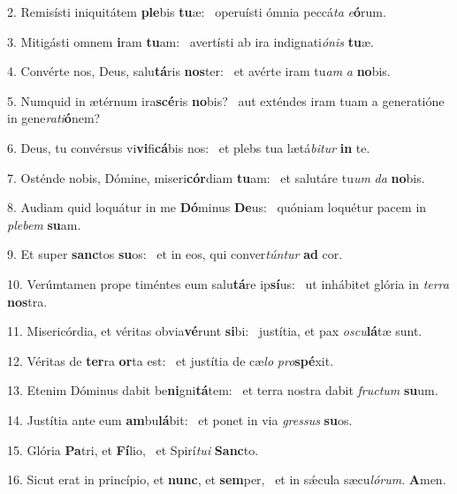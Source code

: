 2. Remisísti iniquitátem \textbf{ple}bis \textbf{tu}æ: \ast\  operuísti ómnia peccá\textit{ta} \textit{e}\textbf{ó}rum.\

3. Mitigásti omnem \textbf{i}ram \textbf{tu}am: \ast\  avertísti ab ira indignati\textit{ó}\textit{nis} \textbf{tu}æ.\

4. Convérte nos, Deus, salu\textbf{tá}ris \textbf{nos}ter: \ast\  et avérte iram tu\textit{am} \textit{a} \textbf{no}bis.\

5. Numquid in ætérnum ira\textbf{scé}ris \textbf{no}bis? \ast\  aut exténdes iram tuam a generatióne in gene\textit{ra}\textit{ti}\textbf{ó}nem?\

6. Deus, tu convérsus vi\textbf{vi}fi\textbf{cá}bis nos: \ast\  et plebs tua lætá\textit{bi}\textit{tur} \textbf{in} te.\

7. Osténde nobis, Dómine, miseri\textbf{cór}diam \textbf{tu}am: \ast\  et salutáre tu\textit{um} \textit{da} \textbf{no}bis.\

8. Audiam quid loquátur in me \textbf{Dó}minus \textbf{De}us: \ast\  quóniam loquétur pacem in \textit{ple}\textit{bem} \textbf{su}am.\

9. Et super \textbf{sanc}tos \textbf{su}os: \ast\  et in eos, qui conver\textit{tún}\textit{tur} \textbf{ad} cor.\

10. Verúmtamen prope timéntes eum salu\textbf{tá}re ip\textbf{sí}us: \ast\  ut inhábitet glória in \textit{ter}\textit{ra} \textbf{nos}tra.\

11. Misericórdia, et véritas obvia\textbf{vé}runt \textbf{si}bi: \ast\  justítia, et pax \textit{os}\textit{cu}\textbf{lá}tæ sunt.\

12. Véritas de \textbf{ter}ra \textbf{or}ta est: \ast\  et justítia de cæ\textit{lo} \textit{pro}\textbf{spé}xit.\

13. Etenim Dóminus dabit be\textbf{ni}gni\textbf{tá}tem: \ast\  et terra nostra dabit \textit{fruc}\textit{tum} \textbf{su}um.\

14. Justítia ante eum \textbf{am}bu\textbf{lá}bit: \ast\  et ponet in via \textit{gres}\textit{sus} \textbf{su}os.\

15. Glória \textbf{Pa}tri, et \textbf{Fí}lio, \ast\  et Spirí\textit{tu}\textit{i} \textbf{Sanc}to.\

16. Sicut erat in princípio, et \textbf{nunc}, et \textbf{sem}per, \ast\  et in sǽcula sæcu\textit{ló}\textit{rum}. \textbf{A}men.\

